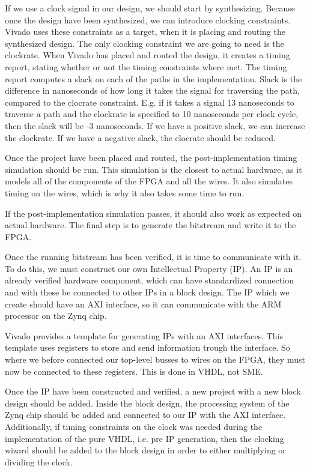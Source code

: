 If we use a clock signal in our design, we should start by synthesizing. Because once
the design have been synthesized, we can introduce clocking constraints. Vivado uses
these constraints as a target, when it is placing and routing the synthesized design.
The only clocking constraint we are going to need is the clockrate. When Vivado has
placed and routed the design, it creates a timing report, stating whether or not the
timing constraints where met. The timing report computes a slack on each of the paths
in the implementation. Slack is the difference in nanoseconds of how long it takes
the signal for traversing the path, compared to the clocrate constraint. E.g. if it takes
a signal 13 nanoseconds to traverse a path and the clockrate is specified to 10 nanoseconds
per clock cycle, then the slack will be -3 nanoseconds. If we have a positive slack, we
can increase the clockrate. If we have a negative slack, the clocrate should be reduced.

Once the project have been placed and routed, the post-implementation timing
simulation should be run. This simulation is the closest to actual hardware, as
it models all of the components of the FPGA and all the wires. It also
simulates timing on the wires, which is why it also takes some time to run.

If the post-implementation simulation passes, it should also work as expected
on actual hardware. The final step is to generate the bitstream and write it to
the FPGA.

Once the running bitstream has been verified, it is time to communicate with
it. To do this, we must construct our own Intellectual Property (IP). An IP is
an already verified hardware component, which can have standardized connection
and with these be connected to other IPs in a block design. The IP which we
create should have an AXI interface, so it can communicate with the ARM
processor on the Zynq chip.

Vivado provides a template for generating IPs with an AXI interfaces. This
template uses registers to store and send information trough the interface. So
where we before connected our top-level busses to wires on the FPGA, they must
now be connected to these registers. This is done in VHDL, not SME.

Once the IP have been constructed and verified, a new project with a new block
design should be added. Inside the block design, the processing system of the
Zynq chip should be added and connected to our IP with the AXI interface.
Additionally, if timing constraints on the clock was needed during the
implementation of the pure VHDL, i.e. pre IP generation, then the clocking
wizard should be added to the block design in order to either multiplying or
dividing the clock.

